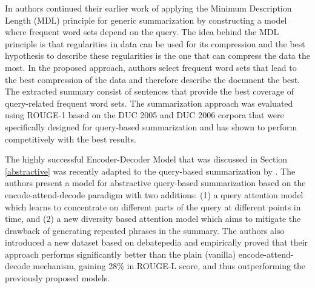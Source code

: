 \documentclass[11pt,a4paper,onecolumn]{article}
\begin{document}
In \cite{litvak2017query} authors continued their earlier work \cite{litvak2015krimping} of applying the Minimum Description Length (MDL) principle for generic summarization by constructing a model where frequent word sets depend on the query.
The idea behind the MDL principle is that regularities in data can be used for its compression and the best hypothesis to describe these regularities is the one that can compress the data the most.
In the proposed approach, authors select frequent word sets that lead to the best compression of the data and therefore describe the document the best.
The extracted summary consist of sentences that provide the best coverage of query-related frequent word sets.
The summarization approach was evaluated using ROUGE-1 based on the DUC 2005 and DUC 2006 corpora that were specifically designed for query-based summarization and has shown to perform competitively with the best results.

The highly successful Encoder-Decoder Model that was discussed in Section \ref{abstractive} was recently adapted to the query-based summarization by \cite{nema2017diversity}.
The authors present a model for abstractive query-based summarization based on the encode-attend-decode paradigm with two additions: (1) a query attention model which learns to concentrate on different parts of the query at different points in time, and (2) a new diversity based attention model which aims to mitigate the drawback of generating repeated phrases in the summary.
The authors also introduced a new dataset based on debatepedia and empirically proved that their approach performs significantly better than the plain (vanilla) encode-attend-decode mechanism, gaining 28\% in ROUGE-L score, and thus outperforming the previously proposed models.
\end{document}
